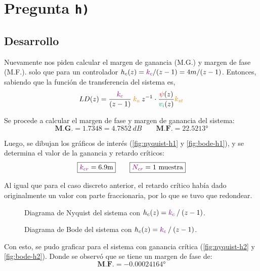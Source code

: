 \section{Pregunta \texttt{h)}}\label{pregunta-h}


\subsection{Desarrollo}

Nuevamente nos piden calcular el margen de ganancia (M.G.) y margen de fase
(M.F.). solo que para un controlador \(h_c(z)= \mathbin{\color{violet}k_c}/(z-1) = 4m / (z-1)\).
Entonces, sabiendo que la función de transferencia del sistema es,
\begin{equation}
  LD(z) = \frac{\mora{k_{c}}}{(z-1)} \nara{ k_{a}} z^{-1} \cdot \frac{\rojo{\psi}(z)}{\verd{v_i}(z)} \nara{k_{st}}  
\end{equation}

Se procede a calcular el margen de fase y margen de ganancia del sistema:
\begin{equation}
  \boxed{\textbf{M.G.} = 1.7348 = 4.7852\ \unit{dB}} \qquad \boxed{\textbf{M.F.} = \ang{22.5213}}
\end{equation}

Luego, se dibujan los gráficos de interés (\autoref{fig:nyquist-h1} y \autoref{fig:bode-h1}),
y se determina el valor de la ganancia y retardo críticos:
\begin{equation}
  \boxed{\mora{k_{cr}} = 6.9\unit{m}} \qquad \boxed{\mora{N_{cr}} = 1\ \unit{muestra}}
\end{equation}

Al igual que para el caso discreto anterior, el retardo crítico había dado
originalmente un valor con parte fraccionaria, por lo que se tuvo que redondear.

\begin{figure}[h]
  \centering
  
  \caption{Diagrama de Nyquist del sistema con $h_{c}(z) = \mathbin{\color{violet}k_{c}}\mathbin{/}(z-1)$.}
  \label{fig:nyquist-h1}
\end{figure}

\begin{figure}[h]
  \centering
  
  \caption{Diagrama de Bode del sistema con $h_{c}(z) = \mathbin{\color{violet}k_{c}}\mathbin{/}(z-1)$.}
  \label{fig:bode-h1}
\end{figure}

Con esto, se pudo graficar para el sistema con ganancia crítica (\autoref{fig:nyquist-h2} y
\autoref{fig:bode-h2}). Donde se observó que se tiene un margen de fase de:
\begin{equation}
  \boxed{\textbf{M.F.} = \ang{-0.00024164}}
\end{equation}


